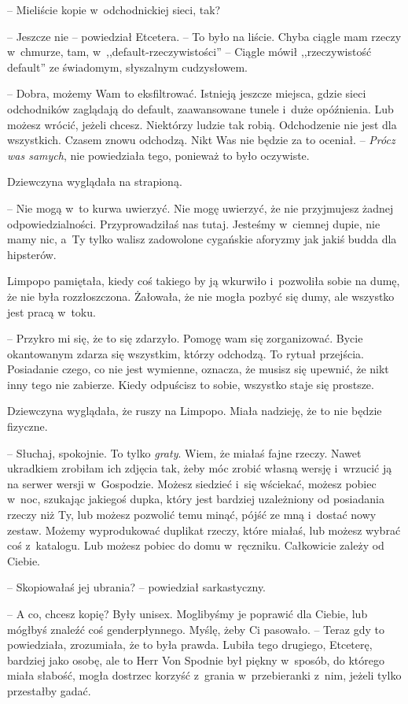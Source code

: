 \documentclass[oneside,polish,11pt,sfheadings]{mwbk}
\begin{document}
-- Mieliście kopie w~odchodnickiej sieci, tak?

-- Jeszcze nie -- powiedział Etcetera. -- To było na liście. Chyba ciągle
mam rzeczy w~chmurze, tam, w~,,default-rzeczywistości'' -- Ciągle mówił
,,rzeczywistość default'' ze świadomym, słyszalnym cudzysłowem.

-- Dobra, możemy Wam to eksfiltrować. Istnieją jeszcze miejsca, gdzie
sieci odchodników zaglądają do default, zaawansowane tunele i~duże
opóźnienia. Lub możesz wrócić, jeżeli chcesz. Niektórzy ludzie tak
robią. Odchodzenie nie jest dla wszystkich. Czasem znowu odchodzą. Nikt
Was nie będzie za to oceniał. -- \textit{Prócz was samych}, nie powiedziała
tego, ponieważ to było oczywiste.

Dziewczyna wyglądała na strapioną. 

-- Nie mogą w~to kurwa uwierzyć. Nie
mogę uwierzyć, że nie przyjmujesz żadnej odpowiedzialności.
Przyprowadziłaś nas tutaj. Jesteśmy w~ciemnej dupie, nie mamy nic, a~Ty
tylko walisz zadowolone cygańskie aforyzmy jak jakiś budda dla
hipsterów.

Limpopo pamiętała, kiedy coś takiego by ją wkurwiło i~pozwoliła sobie na
dumę, że nie była rozzłoszczona. Żałowała, że nie mogła pozbyć się dumy,
ale wszystko jest pracą w~toku. 

-- Przykro mi się, że to się zdarzyło.
Pomogę wam się zorganizować. Bycie okantowanym zdarza się wszystkim,
którzy odchodzą. To rytuał przejścia. Posiadanie czego, co nie jest
wymienne, oznacza, że musisz się upewnić, że nikt inny tego nie
zabierze. Kiedy odpuścisz to sobie, wszystko staje się prostsze.

Dziewczyna wyglądała, że ruszy na Limpopo. Miała nadzieję, że to nie
będzie fizyczne.

-- Słuchaj, spokojnie. To tylko \textit{graty}. Wiem, że miałaś fajne
rzeczy. Nawet ukradkiem zrobiłam ich zdjęcia tak, żeby móc zrobić własną
wersję i~wrzucić ją na serwer wersji w~Gospodzie. Możesz siedzieć i~się
wściekać, możesz pobiec w~noc, szukając jakiegoś dupka, który jest
bardziej uzależniony od posiadania rzeczy niż Ty, lub możesz pozwolić
temu minąć, pójść ze mną i~dostać nowy zestaw. Możemy wyprodukować
duplikat rzeczy, które miałaś, lub możesz wybrać coś z~katalogu. Lub
możesz pobiec do domu w~ręczniku. Całkowicie zależy od Ciebie.

-- Skopiowałaś jej ubrania? -- powiedział sarkastyczny.

-- A co, chcesz kopię? Były unisex. Moglibyśmy je poprawić dla Ciebie,
lub mógłbyś znaleźć coś genderpłynnego. Myślę, żeby Ci pasowało. -- Teraz
gdy to powiedziała, zrozumiała, że to była prawda. Lubiła tego drugiego,
Etceterę, bardziej jako osobę, ale to Herr Von Spodnie był piękny w~sposób, do którego miała słabość, mogła dostrzec korzyść z~grania w~przebieranki z~nim, jeżeli tylko przestałby gadać.
\end{document}
